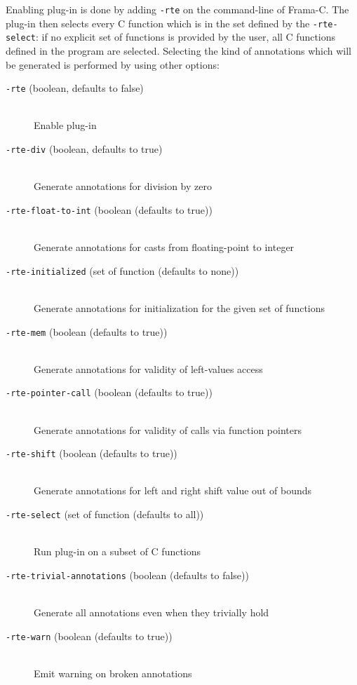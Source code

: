 Enabling \rte{} plug-in is done by adding \lstinline|-rte| on the command-line
of Frama-C. The plug-in then selects every C function which is in the set
defined by the \lstinline|-rte-select|: if no explicit set of functions is
provided by the user, all C functions defined in the program are selected.
Selecting the kind of annotations which will be generated is performed by using
other \rte{} options:
\begin{description}
\item[{\tt -rte} (boolean, defaults to false)] \ \smallskip \\
     Enable \rte{} plug-in
\item[{\tt -rte-div} (boolean, defaults to true)] \ \smallskip \\
     Generate annotations for division by zero
\item[{\tt -rte-float-to-int} (boolean (defaults to true))] \ \smallskip \\
     Generate annotations for casts from floating-point to integer
\item[{\tt -rte-initialized} (set of function (defaults to none))] \ \smallskip \\
     Generate annotations for initialization for the given set of functions
\item[{\tt -rte-mem} (boolean (defaults to true))] \ \smallskip \\
     Generate annotations for validity of left-values access
\item[{\tt -rte-pointer-call} (boolean (defaults to true))] \ \smallskip \\
     Generate annotations for validity of calls via function pointers
\item[{\tt -rte-shift} (boolean (defaults to true))] \ \smallskip \\
     Generate annotations for left and right shift value out of bounds
\item[{\tt -rte-select} (set of function (defaults to all))] \ \smallskip \\
     Run plug-in on a subset of C functions
\item[{\tt -rte-trivial-annotations} (boolean (defaults to false))] \ \smallskip \\
     Generate all annotations even when they trivially hold
\item[{\tt -rte-warn} (boolean (defaults to true))] \ \smallskip \\
     Emit warning on broken annotations
\end{description}

